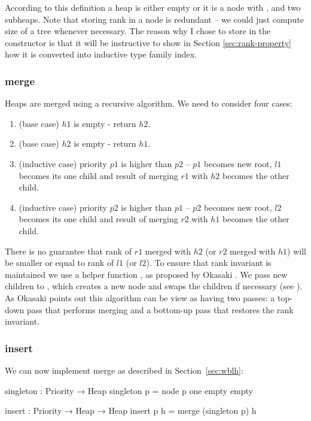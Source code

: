 According to this definition a heap is either empty or it is a node with \Priority, \Rank and two subheaps. Note that storing rank in a node is redundant -- we could just compute size of a tree whenever necessary. The reason why I chose to store \Rank in the constructor is that it will be instructive to show in Section \ref{sec:rank-property} how it is converted into inductive type family index.

\subsubsection{merge}

Heaps are merged using a recursive algorithm. We need to consider four cases:

\begin{enumerate}
 \item (base case) $h1$ is empty - return $h2$.
 \item (base case) $h2$ is empty - return $h1$.
 \item (inductive case) priority $p1$ is higher than $p2$ -- $p1$ becomes new root, $l1$ becomes its one child and result of merging $r1$ with $h2$ becomes the other child.
 \item (inductive case) priority $p2$ is higher than $p1$ -- $p2$ becomes new root, $l2$ becomes its one child and result of merging $r2$ with $h1$ becomes the other child.
\end{enumerate}

There is no guarantee that rank of $r1$ merged with $h2$ (or $r2$ merged with $h1$) will be smaller or equal to rank of $l1$ (or $l2$). To ensure that rank invariant is maintained we use a helper function \makeT, as proposed by Okasaki \cite{Oka99}. We pass new children to \makeT, which creates a new node and swaps the children if necessary (see ). As Okasaki points out this algorithm can be view as having two passes: a top-down pass that performs merging and a bottom-up pass that restores the rank invariant.

\subsubsection{insert}

We can now implement merge as described in Section~\ref{sec:wblh}:

\begin{code}
singleton : Priority → Heap
singleton p = node p one empty empty

insert : Priority → Heap → Heap
insert p h = merge (singleton p) h
\end{code}

